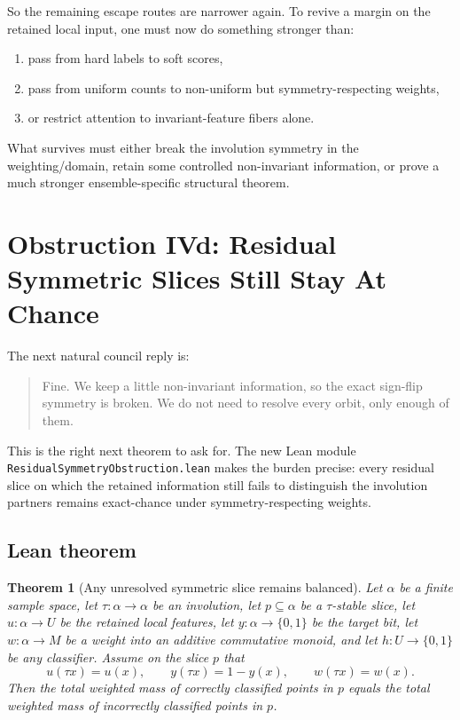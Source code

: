 \documentclass[11pt]{article}
\newtheorem{theorem}{Theorem}[section]
\theoremstyle{remark}
\begin{document}
So the remaining escape routes are narrower again.  To revive a margin on the retained local
input, one must now do something stronger than:
\begin{enumerate}[leftmargin=1.5em]
  \item pass from hard labels to soft scores,
  \item pass from uniform counts to non-uniform but symmetry-respecting weights,
  \item or restrict attention to invariant-feature fibers alone.
\end{enumerate}

What survives must either break the involution symmetry in the weighting/domain, retain some
controlled non-invariant information, or prove a much stronger ensemble-specific structural
theorem.

\section{Obstruction IVd: Residual Symmetric Slices Still Stay At Chance}

The next natural council reply is:
\begin{quote}
Fine.  We keep a little non-invariant information, so the exact sign-flip symmetry is broken.  We
do not need to resolve every orbit, only enough of them.
\end{quote}

This is the right next theorem to ask for.  The new Lean module
\texttt{ResidualSymmetryObstruction.lean} makes the burden precise: every residual slice on which
the retained information still fails to distinguish the involution partners remains exact-chance
under symmetry-respecting weights.

\subsection{Lean theorem}

\begin{theorem}[Any unresolved symmetric slice remains balanced]
Let \(\alpha\) be a finite sample space, let \(\tau : \alpha \to \alpha\) be an involution, let
\(p \subseteq \alpha\) be a \(\tau\)-stable slice, let \(u : \alpha \to U\) be the retained local
features, let \(y : \alpha \to \{0,1\}\) be the target bit, let \(w : \alpha \to M\) be a weight
into an additive commutative monoid, and let \(h : U \to \{0,1\}\) be any classifier.  Assume on
the slice \(p\) that
\[
  u(\tau x) = u(x), \qquad y(\tau x) = 1-y(x), \qquad w(\tau x) = w(x).
\]
Then the total weighted mass of correctly classified points in \(p\) equals the total weighted
mass of incorrectly classified points in \(p\).
\end{theorem}
\end{document}
